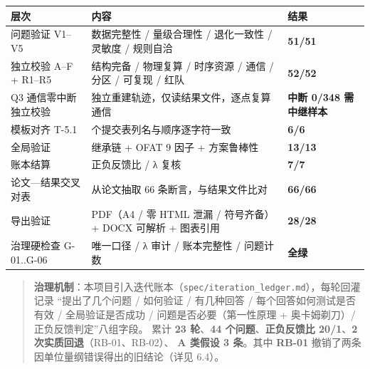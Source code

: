 \documentclass[
  10.5pt,
]{extarticle}
\newcounter{none} %
\begin{document}
{\def\LTcaptype{none} %
\begin{longtable}[]{@{}
  >{\raggedright\arraybackslash}p{}
  >{\raggedright\arraybackslash}p{}
  >{\raggedright\arraybackslash}p{}@{}}
\toprule\noalign{}
\begin{minipage}[b]{\linewidth}\raggedright
层次
\end{minipage} & \begin{minipage}[b]{\linewidth}\raggedright
内容
\end{minipage} & \begin{minipage}[b]{\linewidth}\raggedright
结果
\end{minipage} \\
\midrule\noalign{}
\endhead
\bottomrule\noalign{}
\endlastfoot
问题验证 V1--V5 & 数据完整性 / 量级合理性 / 退化一致性 / 灵敏度 /
规则自洽 & \textbf{51/51} \\
独立校验 A--F + R1--R5 & 结构完备 / 物理复算 / 时序资源 / 通信 / 分区 /
可复现 / 红队 & \textbf{52/52} \\
Q3 通信零中断独立校验 & 独立重建轨迹，仅读结果文件，逐点复算通信 &
\textbf{中断 0/348 需中继样本} \\
模板对齐 T-5.1 & 6 个提交表列名与顺序逐字符一致 & \textbf{6/6} \\
全局验证 & 继承链 + OFAT 9 因子 + 方案鲁棒性 & \textbf{13/13} \\
账本结算 & 正负反馈比 / λ 复核 & \textbf{7/7} \\
论文---结果交叉对表 & 从论文抽取 66 条断言，与结果文件比对 &
\textbf{66/66} \\
导出验证 & PDF（A4 / 零 HTML 泄漏 / 符号齐备）+ DOCX 可解析 + 图表引用 &
\textbf{28/28} \\
治理硬检查 G-01..G-06 & 唯一口径 / λ 审计 / 账本完整性 / 问题计数 &
\textbf{全绿} \\
\end{longtable}
}

\begin{quote}
\textbf{治理机制}：本项目引入迭代账本（\texttt{spec/iteration\_ledger.md}），每轮回灌记录
``提出了几个问题 / 如何验证 / 有几种回答 / 每个回答如何测试是否有效 /
全局验证是否成功 / 问题是否必要（第一性原理 + 奥卡姆剃刀）/
正负反馈判定''八组字段。 累计 \textbf{23 轮}、\textbf{44
个问题}、\textbf{正负反馈比 20/1}、\textbf{2
次实质回退}（RB-01、RB-02）、 \textbf{A 类假设 3 条}。其中
\textbf{RB-01} 撤销了两条因单位量纲错误得出的旧结论（详见 6.4）。
\end{quote}
\end{document}
